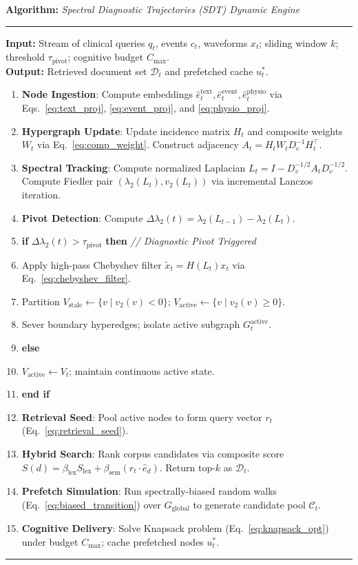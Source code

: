 \documentclass[10pt, onecolumn]{article}
\newenvironment{pseudocode}[1]{%
  \begin{list}{}{\setlength{\leftmargin}{1em}\setlength{\itemsep}{1pt}}
  \item \textbf{Algorithm:} \textit{#1}
  \item \hrule \medskip
}{%
  \vspace{4pt}\hrule
  \end{list}
}
\begin{document}
\begin{pseudocode}{Spectral Diagnostic Trajectories (SDT) Dynamic Engine}
\textbf{Input:} Stream of clinical queries $q_t$, events $c_t$, waveforms $x_t$; sliding window $k$; threshold $\tau_{\text{pivot}}$; cognitive budget $C_{\max}$.\\
\textbf{Output:} Retrieved document set $\mathcal{D}_t$ and prefetched cache $u_t^*$.
\begin{enumerate}
  \item \textbf{Node Ingestion}: Compute embeddings $\hat{e}_t^{\text{text}}, \hat{e}_t^{\text{event}}, \hat{e}_t^{\text{physio}}$ via Eqs.~\eqref{eq:text_proj}, \eqref{eq:event_proj}, and \eqref{eq:physio_proj}.
  \item \textbf{Hypergraph Update}: Update incidence matrix $H_t$ and composite weights $W_t$ via Eq.~\eqref{eq:comp_weight}. Construct adjacency $A_t = H_t W_t D_e^{-1} H_t^\top$.
  \item \textbf{Spectral Tracking}: Compute normalized Laplacian $L_t = I - D_v^{-1/2} A_t D_v^{-1/2}$. Compute Fiedler pair $(\lambda_2(L_t), v_2(L_t))$ via incremental Lanczos iteration.
  \item \textbf{Pivot Detection}: Compute $\Delta \lambda_2(t) = \lambda_2(L_{t-1}) - \lambda_2(L_t)$.
  \item \textbf{if} $\Delta \lambda_2(t) > \tau_{\text{pivot}}$ \textbf{then} \quad \textit{// Diagnostic Pivot Triggered}
  \item \quad Apply high-pass Chebyshev filter $\tilde{x}_t = H(L_t) x_t$ via Eq.~\eqref{eq:chebyshev_filter}.
  \item \quad Partition $V_{\text{stale}} \leftarrow \{v \mid v_2(v) < 0\}$; $V_{\text{active}} \leftarrow \{v \mid v_2(v) \ge 0\}$.
  \item \quad Sever boundary hyperedges; isolate active subgraph $G_t^{\text{active}}$.
  \item \textbf{else}
  \item \quad $V_{\text{active}} \leftarrow V_t$; maintain continuous active state.
  \item \textbf{end if}
  \item \textbf{Retrieval Seed}: Pool active nodes to form query vector $r_t$ (Eq.~\eqref{eq:retrieval_seed}).
  \item \textbf{Hybrid Search}: Rank corpus candidates via composite score $S(d) = \beta_{\text{lex}} S_{\text{lex}} + \beta_{\text{sem}} (r_t \cdot \hat{e}_d)$. Return top-$k$ as $\mathcal{D}_t$.
  \item \textbf{Prefetch Simulation}: Run spectrally-biased random walks (Eq.~\eqref{eq:biased_transition}) over $G_{\text{global}}$ to generate candidate pool $\mathcal{C}_t$.
  \item \textbf{Cognitive Delivery}: Solve Knapsack problem (Eq.~\eqref{eq:knapsack_opt}) under budget $C_{\max}$; cache prefetched nodes $u_t^*$.
\end{enumerate}
\end{pseudocode}
\end{document}
